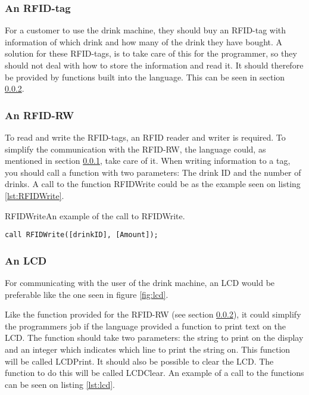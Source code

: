 \subsubsection{An RFID-tag}
\label{sec:RFIDtag}
For a customer to use the drink machine, they should buy an RFID-tag with information of which drink and how many of the drink they have bought. A solution for these RFID-tags, is to take care of this for the programmer, so they should not deal with how to store the information and read it. It should therefore be provided by functions built into the language. This can be seen in section \ref{sec:RFIDRW}.

\subsubsection{An RFID-RW}
\label{sec:RFIDRW}
To read and write the RFID-tags, an RFID reader and writer is required. To simplify the communication with the RFID-RW, the language could, as mentioned in section \ref{sec:RFIDtag}, take care of it. When writing information to a tag, you should call a function with two parameters: The drink ID and the number of drinks. A call to the function RFIDWrite could be as the example seen on listing \ref{lst:RFIDWrite}.

\begin{code}{RFIDWrite}{An example of the call to RFIDWrite.}
\begin{lstlisting}[mathescape]
call RFIDWrite([drinkID], [Amount]);
\end{lstlisting}
\end{code}

\subsubsection{An LCD}
For communicating with the user of the drink machine, an LCD would be preferable like the one seen in figure \ref{fig:lcd}.


Like the function provided for the RFID-RW (see section \ref{sec:RFIDRW}), it could simplify the programmers job if the language provided a function to print text on the LCD. The function should take two parameters: the string to print on the display and an integer which indicates which line to print the string on. This function will be called LCDPrint. It should also be possible to clear the LCD. The function to do this will be called LCDClear. An example of a call to the functions can be seen on listing \ref{lst:lcd}.

